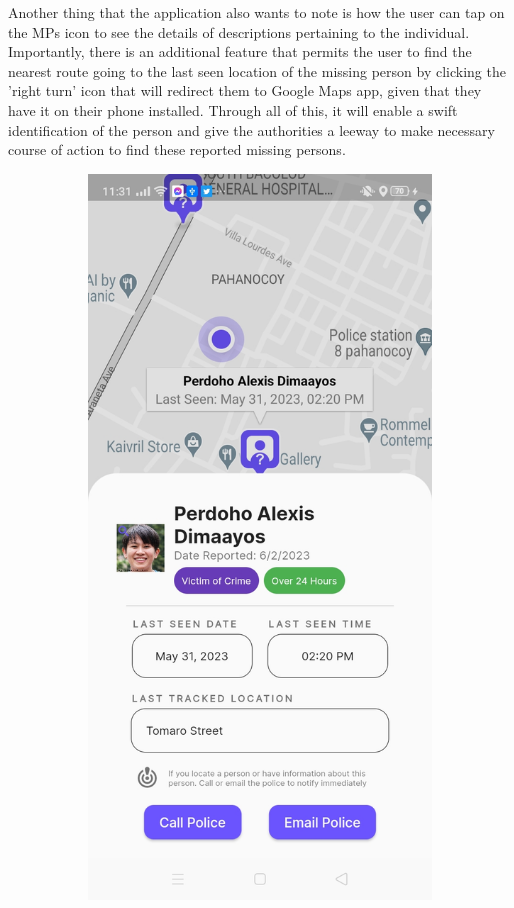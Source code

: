 Another thing that the application also wants to note is how the user can tap on the MPs icon to see the details of descriptions pertaining to the individual. Importantly, there is an additional feature that permits the user to find the nearest route going to the last seen location of the missing person by clicking the 'right turn' icon that will redirect them to Google Maps app, given that they have it on their phone installed. Through all of this, it will enable a swift identification of the person and give the authorities a leeway to make necessary course of action to find these reported missing persons.

\begin{figure}[!h]
    \centering
    \begin{subfigure}[c]{0.30\linewidth}
        \centering
        \includegraphics[scale=0.15]{figures/Chapter4/Main/NearbyMP-1.jpg}

\end{subfigure}
\end{figure}
